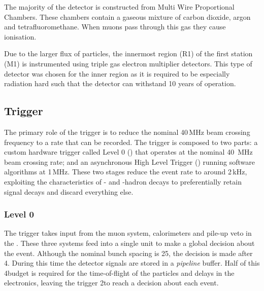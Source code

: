 The majority of the detector is constructed from Multi Wire Proportional Chambers. These chambers contain a gaseous mixture of carbon dioxide, argon and tetrafluoromethane. When muons pass through this gas they cause ionisation. 

Due to the larger flux of particles, the innermost region (R1) of the first station (M1) is instrumented using triple gas electron multiplier detectors. 
This type of detector was chosen for the inner region as it is required to be especially radiation hard such that the detector can withstand 10 years of operation.  

\subsection{Trigger}
\label{sec:Dec_trigger}

The primary role of the trigger is to reduce the nominal 40\,MHz beam crossing frequency to a rate that can be recorded. The trigger is composed to two parts: a custom hardware trigger called Level 0 (\lone) that operates at the nominal 40\, MHz beam crossing rate; and an asynchronous High Level Trigger (\hlt) running software algorithms at 1\,MHz. These two stages reduce the event rate to around 2\,kHz, exploiting the characteristics of \bquark- and \cquark-hadron decays to preferentially retain signal decays and discard everything else.

\subsubsection{Level 0}
The \lone trigger takes input from the muon system, calorimeters and pile-up veto in the \velo. These three systems feed into a single unit to make a global decision about the event. Although the nominal bunch spacing is 25\ns, the \lone decision is made after 4\mus. During this time the detector signals are stored in a \emph{pipeline} buffer. Half of this 4\mus budget is required for the time-of-flight of the particles and delays in the electronics, leaving the \lone trigger 2\mus to reach a decision about each event.  

